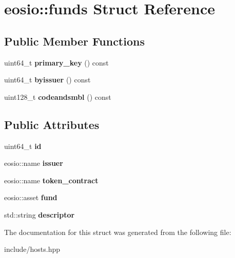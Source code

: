 \hypertarget{structeosio_1_1funds}{}\section{eosio\+:\+:funds Struct Reference}
\label{structeosio_1_1funds}
\subsection*{Public Member Functions}
\begin{DoxyCompactItemize}
\item 
\mbox{\label{structeosio_1_1funds_a67662948d6df0ced4902deec87dc902b}} 
uint64\+\_\+t {\bfseries primary\+\_\+key} () const
\item 
\mbox{\label{structeosio_1_1funds_a6a3e480aea80174230a3fa7861538677}} 
uint64\+\_\+t {\bfseries byissuer} () const
\item 
\mbox{\label{structeosio_1_1funds_acfee8bfeb5a5a13532c03ee51267c965}} 
uint128\+\_\+t {\bfseries codeandsmbl} () const
\end{DoxyCompactItemize}
\subsection*{Public Attributes}
\begin{DoxyCompactItemize}
\item 
\mbox{\label{structeosio_1_1funds_a488be042f2ce72560bd43d6020c214ec}} 
uint64\+\_\+t {\bfseries id}
\item 
\mbox{\label{structeosio_1_1funds_a87b777161d3dc8539908c29aa54df6e3}} 
eosio\+::name {\bfseries issuer}
\item 
\mbox{\label{structeosio_1_1funds_aeea7e7bc23b5202f8727d473ff767399}} 
eosio\+::name {\bfseries token\+\_\+contract}
\item 
\mbox{\label{structeosio_1_1funds_a72d542af0e4ed16e629faae1ba356979}} 
eosio\+::asset {\bfseries fund}
\item 
\mbox{\label{structeosio_1_1funds_adaab44ee2862dc7186301aa16d95e756}} 
std\+::string {\bfseries descriptor}
\end{DoxyCompactItemize}


The documentation for this struct was generated from the following file\+:\begin{DoxyCompactItemize}
\item 
include/hosts.\+hpp\end{DoxyCompactItemize}
